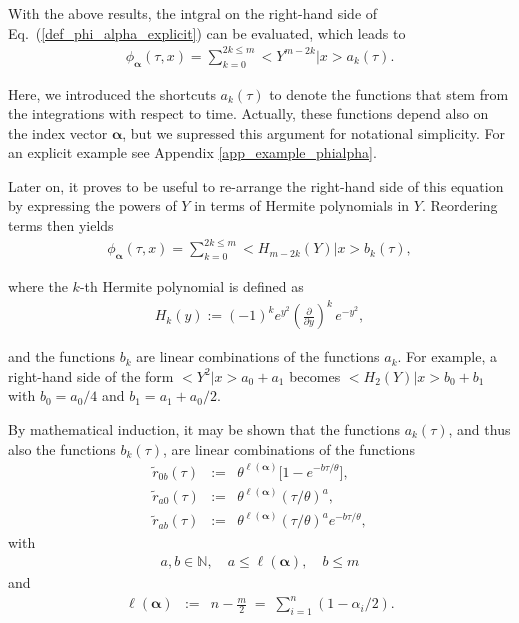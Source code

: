 \documentclass[aps,twocolumn,superscriptaddress,showpacs,showkeys]{revtex4}
\newcommand{\p}{\partial}
\newcommand{\vecalpha}{{\boldsymbol{\alpha}}}
\begin{document}
\noindent With the above results, the intgral on the right-hand side of Eq.~(\ref{def_phi_alpha_explicit}) can be evaluated,
which leads to
%
\begin{eqnarray}
\phi_{\vecalpha}(\tau,x) = \sum_{k=0}^{2k\le m}\big<Y^{m-2k}|x\big>a_k(\tau).
\end{eqnarray}

\noindent Here, we introduced the shortcuts $a_k(\tau)$ to denote the functions that stem from the integrations with respect
to time. Actually, these functions depend also on the index vector $\vecalpha$, but we supressed this argument for notational
simplicity. For an explicit example see Appendix \ref{app_example_phialpha}.

Later on, it proves to be useful to re-arrange the right-hand side of this equation by expressing the
powers of $Y$ in terms of Hermite polynomials in $Y$. Reordering terms then yields 
%
\begin{eqnarray}
\phi_{\vecalpha}(\tau,x) = \sum_{k=0}^{2k\le m}\big<H_{m-2k}(Y)|x\big>b_k(\tau),
\end{eqnarray}

\noindent where the $k$-th Hermite polynomial is defined as
%
\begin{eqnarray}
H_k(y) := (-1)^ke^{y^2}\left(\frac{\p}{\p y}\right)^k\,e^{-y^2},
\end{eqnarray}

\noindent and the functions $b_k$ are linear combinations of the functions $a_k$. For example, a right-hand side of the
form $\big<Y^2|x\big>a_0+a_1$ becomes $\big<H_2(Y)|x\big>b_0+b_1$ with $b_0=a_0/4$ and $b_1=a_1+a_0/2$.

By mathematical induction, it may be shown that the functions $a_k(\tau)$, and thus also the functions $b_k(\tau)$, are
linear combinations of the functions
%
\begin{subequations}\label{r_ab_alpha}
\begin{eqnarray}
\tilde r_{0b}(\tau) &:=& \theta^{\ell(\vecalpha)}\big[1-e^{-b\tau/\theta}\big],\\
\tilde r_{a0}(\tau) &:=& \theta^{\ell(\vecalpha)}\left(\tau/\theta\right)^a,\\
\tilde r_{ab}(\tau) &:=& \theta^{\ell(\vecalpha)}\left(\tau/\theta\right)^a e^{-b\tau/\theta},
\end{eqnarray}
\end{subequations}
\noindent with
\begin{eqnarray}
a,b\in\mathbb{N},\quad a\le \ell(\vecalpha),\quad b\le m
\end{eqnarray}
\noindent and
%
\begin{eqnarray}
\ell(\vecalpha) &:=& n-\frac{m}{2} \;=\; \sum_{i=1}^n(1-\alpha_i/2).
\end{eqnarray}
\end{document}
